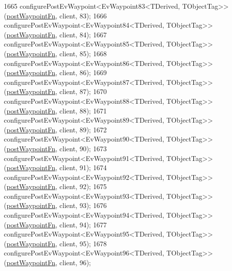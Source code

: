 \begin{DoxyCode}
1665     configurePostEvWaypoint<EvWaypoint83<TDerived, TObjectTag>>(\hyperlink{classcl__move__base__z_1_1WaypointEventDispatcher_a964a57fcce5d48ec60243230722d8dd7}{postWaypointFn}, client, 83);
1666     configurePostEvWaypoint<EvWaypoint84<TDerived, TObjectTag>>(\hyperlink{classcl__move__base__z_1_1WaypointEventDispatcher_a964a57fcce5d48ec60243230722d8dd7}{postWaypointFn}, client, 84);
1667     configurePostEvWaypoint<EvWaypoint85<TDerived, TObjectTag>>(\hyperlink{classcl__move__base__z_1_1WaypointEventDispatcher_a964a57fcce5d48ec60243230722d8dd7}{postWaypointFn}, client, 85);
1668     configurePostEvWaypoint<EvWaypoint86<TDerived, TObjectTag>>(\hyperlink{classcl__move__base__z_1_1WaypointEventDispatcher_a964a57fcce5d48ec60243230722d8dd7}{postWaypointFn}, client, 86);
1669     configurePostEvWaypoint<EvWaypoint87<TDerived, TObjectTag>>(\hyperlink{classcl__move__base__z_1_1WaypointEventDispatcher_a964a57fcce5d48ec60243230722d8dd7}{postWaypointFn}, client, 87);
1670     configurePostEvWaypoint<EvWaypoint88<TDerived, TObjectTag>>(\hyperlink{classcl__move__base__z_1_1WaypointEventDispatcher_a964a57fcce5d48ec60243230722d8dd7}{postWaypointFn}, client, 88);
1671     configurePostEvWaypoint<EvWaypoint89<TDerived, TObjectTag>>(\hyperlink{classcl__move__base__z_1_1WaypointEventDispatcher_a964a57fcce5d48ec60243230722d8dd7}{postWaypointFn}, client, 89);
1672     configurePostEvWaypoint<EvWaypoint90<TDerived, TObjectTag>>(\hyperlink{classcl__move__base__z_1_1WaypointEventDispatcher_a964a57fcce5d48ec60243230722d8dd7}{postWaypointFn}, client, 90);
1673     configurePostEvWaypoint<EvWaypoint91<TDerived, TObjectTag>>(\hyperlink{classcl__move__base__z_1_1WaypointEventDispatcher_a964a57fcce5d48ec60243230722d8dd7}{postWaypointFn}, client, 91);
1674     configurePostEvWaypoint<EvWaypoint92<TDerived, TObjectTag>>(\hyperlink{classcl__move__base__z_1_1WaypointEventDispatcher_a964a57fcce5d48ec60243230722d8dd7}{postWaypointFn}, client, 92);
1675     configurePostEvWaypoint<EvWaypoint93<TDerived, TObjectTag>>(\hyperlink{classcl__move__base__z_1_1WaypointEventDispatcher_a964a57fcce5d48ec60243230722d8dd7}{postWaypointFn}, client, 93);
1676     configurePostEvWaypoint<EvWaypoint94<TDerived, TObjectTag>>(\hyperlink{classcl__move__base__z_1_1WaypointEventDispatcher_a964a57fcce5d48ec60243230722d8dd7}{postWaypointFn}, client, 94);
1677     configurePostEvWaypoint<EvWaypoint95<TDerived, TObjectTag>>(\hyperlink{classcl__move__base__z_1_1WaypointEventDispatcher_a964a57fcce5d48ec60243230722d8dd7}{postWaypointFn}, client, 95);
1678     configurePostEvWaypoint<EvWaypoint96<TDerived, TObjectTag>>(\hyperlink{classcl__move__base__z_1_1WaypointEventDispatcher_a964a57fcce5d48ec60243230722d8dd7}{postWaypointFn}, client, 96);

\end{DoxyCode}
